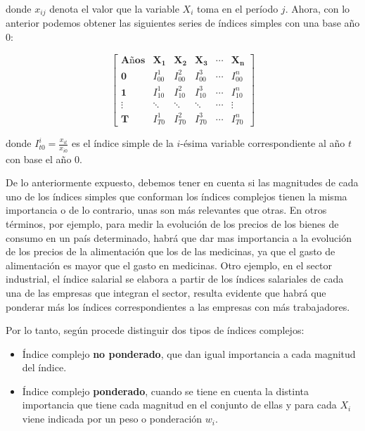 \documentclass[
]{book}
\begin{document}
donde \(x_{ij}\) denota el valor que la variable \(X_i\) toma en el período \(j\). Ahora, con lo anterior podemos obtener las siguientes series de índices simples con una base año 0:

\[
\begin{equation}
\begin{bmatrix}
  \textbf{Años} & \mathbf{X_1} & \mathbf{X_2} & \mathbf{X_3} &\cdots & \mathbf{X_n}\\
     \mathbf{0}& I_{00}^{1} & I_{00}^{2} & I_{00}^{3} & \cdots & I_{00}^{n}\\
    \mathbf{1} & I_{10}^{1} & I_{10}^{2} & I_{10}^{3} & \cdots & I_{10}^{n}\\
     \vdots & \ddots & \ddots & \ddots & \cdots & \vdots\\
     \mathbf{T} & I_{T0}^{1} & I_{T0}^{2} & I_{T0}^{3} & \cdots & I_{T0}^{n}
    \end{bmatrix}
\end{equation}
\]

donde \(I_{t0}^{i}=\frac{x_{it}}{x_{i0}}\) es el índice simple de la \(i\)-ésima variable correspondiente al año \(t\) con base el año 0.

De lo anteriormente expuesto, debemos tener en cuenta si las magnitudes de cada uno de los índices simples que conforman los índices complejos tienen la misma importancia o de lo contrario, unas son más relevantes que otras. En otros términos, por ejemplo, para medir la evolución de los precios de los bienes de consumo en un país determinado, habrá que dar mas importancia a la evolución de los precios de la alimentación que los de las medicinas, ya que el gasto de alimentación es mayor que el gasto en medicinas. Otro ejemplo, en el sector industrial, el índice salarial se elabora a partir de los índices salariales de cada una de las empresas que integran el sector, resulta evidente que habrá que ponderar más los índices correspondientes a las empresas con más trabajadores.

Por lo tanto, según \citet{arroyo2006manual} procede distinguir dos tipos de índices complejos:

\begin{itemize}
\item
  Índice complejo \textbf{no ponderado}, que dan igual importancia a cada magnitud del índice.
\item
  Índice complejo \textbf{ponderado}, cuando se tiene en cuenta la distinta importancia que tiene cada magnitud en el conjunto de ellas y para cada \(X_i\) viene indicada por un peso o ponderación \(w_i\).
\end{itemize}
\end{document}
